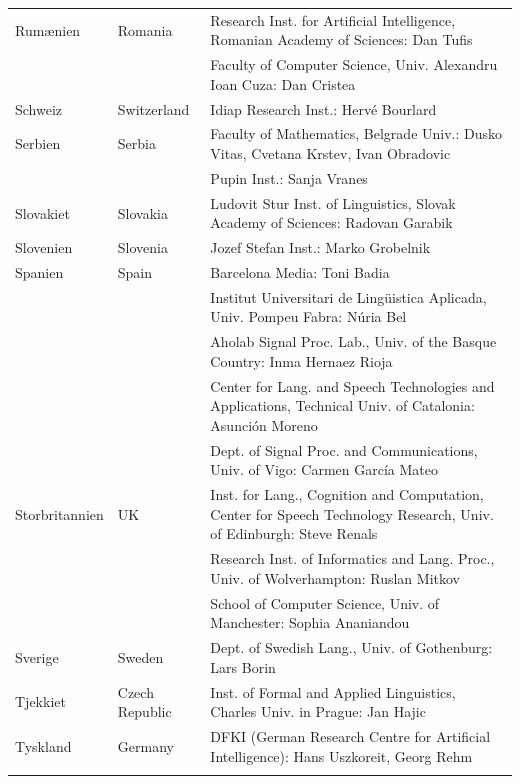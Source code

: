 \documentclass[]{../../metanetpaper}
\begin{document}
\begin{longtable}{llp{105mm}}
  Rum\ae nien & \textcolor{grey1}{Romania} & Research Inst. for Artificial Intelligence, Romanian Academy of Sciences: Dan Tufis \\ \addlinespace
  & & Faculty of Computer Science, Univ. Alexandru Ioan Cuza: Dan Cristea \\ \addlinespace
  Schweiz & \textcolor{grey1}{Switzerland} & Idiap Research Inst.: Hervé Bourlard \\ \addlinespace 
  Serbien & \textcolor{grey1}{Serbia} & Faculty of Mathematics, Belgrade Univ.: Dusko Vitas, Cvetana Krstev, Ivan Obradovic \\ \addlinespace
  & & Pupin Inst.: Sanja Vranes \\ \addlinespace  
  Slovakiet & \textcolor{grey1}{Slovakia} & Ludovit Stur Inst. of Linguistics, Slovak Academy of Sciences: Radovan Garabik \\ \addlinespace 
  Slovenien & \textcolor{grey1}{Slovenia} & Jozef Stefan Inst.: Marko Grobelnik \\ \addlinespace 
  Spanien & \textcolor{grey1}{Spain} & Barcelona Media: Toni Badia \\ \addlinespace 
  & & Institut Universitari de Lingüistica Aplicada, Univ. Pompeu Fabra: Núria Bel \\ \addlinespace 
  & & Aholab Signal Proc. Lab., Univ. of the Basque Country: Inma Hernaez Rioja \\ \addlinespace 
  & & Center for Lang. and Speech Technologies and Applications, Technical Univ. of Catalonia: Asunción Moreno \\ \addlinespace 
  & & Dept. of Signal Proc. and Communications, Univ. of Vigo: Carmen García Mateo \\ \addlinespace 
  Storbritannien & \textcolor{grey1}{UK} & Inst. for Lang., Cognition and Computation, Center for Speech Technology Research, Univ. of Edinburgh: Steve Renals \\ \addlinespace 
  & & Research Inst. of Informatics and Lang. Proc., Univ. of Wolverhampton: Ruslan Mitkov \\ \addlinespace 
  & & School of Computer Science, Univ. of Manchester: Sophia Ananiandou \\ \addlinespace 
Sverige & \textcolor{grey1}{Sweden} & Dept. of Swedish Lang., Univ. of Gothenburg: Lars Borin \\ \addlinespace
  Tjekkiet & \textcolor{grey1}{Czech Republic} & Inst. of Formal and Applied Linguistics, Charles Univ. in Prague: Jan Hajic \\ \addlinespace
 Tyskland & \textcolor{grey1}{Germany} & DFKI (German Research Centre for Artificial Intelligence): Hans Uszkoreit, Georg Rehm\\ \addlinespace

\end{longtable}
\end{document}

